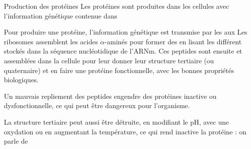 \pasCorrection{\newpage\vspace*{-36pt}}
\begin{doc}{Production des protéines}
  Les protéines sont produites dans les cellules avec l'information génétique contenue dans 
  
  Pour produire une protéine, l'information génétique est transmise par les  aux 
  Les ribosomes assemblent les acides $\alpha$-aminés pour former des  en lisant les différent  stockés dans la séquence nucléotidique de l'ARNm.
  Ces peptides sont ensuite  et assemblées dans la cellule pour leur donner leur structure tertiaire (ou quaternaire) et en faire une protéine fonctionnelle, avec les bonnes propriétés biologiques.

  Un mauvais repliement des peptides engendre des protéines inactive ou dysfonctionnelle, ce qui peut être dangereux pour l'organisme.

  La structure tertiaire peut aussi être détruite, en modifiant le pH, avec une oxydation ou en augmentant la température, ce qui rend inactive la protéine : on parle de 
\end{doc}

